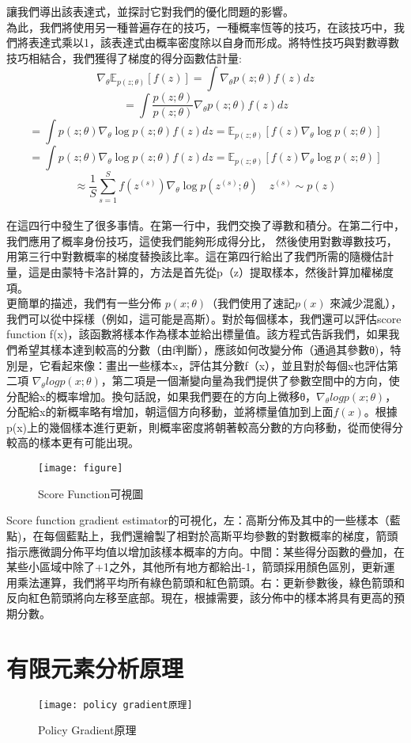  讓我們導出該表達式，並探討它對我們的優化問題的影響。\\
 為此，我們將使用另一種普遍存在的技巧，一種概率恆等的技巧，在該技巧中，我們將表達式乘以1，該表達式由概率密度除以自身而形成。將特性技巧與對數導數技巧相結合，我們獲得了梯度的得分函數估計量:\\
$$\nabla_\theta \mathbb{E}_{p(z;\theta)}[f(z)]=\int\nabla_\theta p(z;\theta)f(z) dz$$
$$= \int \frac{p(z;\theta)}{p(z;\theta)}\nabla_\theta p(z;\theta)f(z) dz$$
$$=\int p(z;\theta)\nabla_\theta \log p(z;\theta)f(z) dz = \mathbb{E}_{p(z;\theta)}[f(z)\nabla_\theta \log p(z;\theta)]$$
$$=\int p(z;\theta)\nabla_\theta \log p(z;\theta)f(z) dz = \mathbb{E}_{p(z;\theta)}[f(z)\nabla_\theta \log p(z;\theta)]$$
$$\approx \frac{1}{S} \sum_{s=1}^{S}f(z^{(s)})\nabla_\theta \log p(z^{(s)};\theta) \quad z^{(s)}\sim p(z)$$\\
在這四行中發生了很多事情。在第一行中，我們交換了導數和積分。在第二行中，我們應用了概率身份技巧，這使我們能夠形成得分比， 然後使用對數導數技巧，用第三行中對數概率的梯度替換該比率。這在第四行給出了我們所需的隨機估計量，這是由蒙特卡洛計算的，方法是首先從p（z）提取樣本，然後計算加權梯度項。\\

更簡單的描述，我們有一些分佈 $p(x;\theta)$（我們使用了速記$ p \left( x \right)$ 來減少混亂），我們可以從中採樣（例如，這可能是高斯）。對於每個樣本，我們還可以評估score function f(x)，該函數將樣本作為樣本並給出標量值。該方程式告訴我們，如果我們希望其樣本達到較高的分數（由f判斷），應該如何改變分佈（通過其參數θ)，特別是，它看起來像：畫出一些樣本x，評估其分數f（x），並且對於每個x也評估第二項 $\nabla_\theta logp(x;θ)$，第二項是一個漸變向量為我們提供了參數空間中的方向，使分配給x的概率增加。換句話說，如果我們要在的方向上微移θ，$\nabla_\theta logp(x;θ)$，分配給x的新概率略有增加，朝這個方向移動，並將標量值加到上面$f(x)$。根據p(x)上的幾個樣本進行更新，則概率密度將朝著較高分數的方向移動，從而使得分較高的樣本更有可能出現。\\
\begin{figure}[hbt!]
\begin{center}
\texttt{[image: figure]}
\caption{Score Function可視圖}
\end{center}
\end{figure}

 Score function gradient estimator的可視化，左：高斯分佈及其中的一些樣本（藍點)，在每個藍點上，我們還繪製了相對於高斯平均參數的對數概率的梯度，箭頭指示應微調分佈平均值以增加該樣本概率的方向。中間：某些得分函數的疊加，在某些小區域中除了+1之外，其他所有地方都給出-1，箭頭採用顏色區別，更新運用乘法運算，我們將平均所有綠色箭頭和紅色箭頭。右：更新參數後，綠色箭頭和反向紅色箭頭將向左移至底部。現在，根據需要，該分佈中的樣本將具有更高的預期分數。\\
\fi
\newpage
\section{有限元素分析原理}
\begin{figure}[hbt!]
\begin{center}
\texttt{[image: policy gradient原理]}
\caption{\Large Policy Gradient原理}
\label{Policy Gradient原理}
\end{center}
\end{figure}
